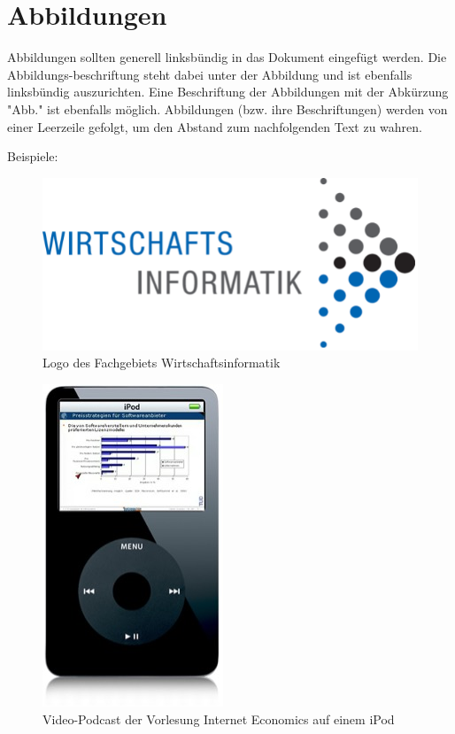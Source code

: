 \documentclass[
	ngerman,
	ruledheaders=section,%
	class=report,%
	thesis={type=bachelor},%
	accentcolor=1b,%
	custommargins=true,%
	marginpar=false,%
	parskip=half-,%
	fontsize=11pt,%
	DIV=14,
]{tudapub}
\begin{document}
 \section{Abbildungen}
Abbildungen sollten generell linksbündig in das Dokument eingefügt werden. Die Abbildungs-beschriftung steht dabei unter der Abbildung und ist ebenfalls linksbündig auszurichten. Eine Beschriftung der Abbildungen mit der Abkürzung "Abb." ist ebenfalls möglich. Abbildungen (bzw. ihre Beschriftungen) werden von einer Leerzeile gefolgt, um den Abstand zum nachfolgenden Text zu wahren.

Beispiele:

 
\begin{figure}[ht]
     \centering
     \includegraphics[]{images/Picture 1.png}
     \caption{Logo des Fachgebiets Wirtschaftsinformatik}
     \label{fig:logo}
\end{figure}

\begin{figure}[ht]
     \centering
     \includegraphics[]{images/Picture 1.jpg}
     \caption{Video-Podcast der Vorlesung Internet Economics auf einem iPod}
     \label{fig:logo2}
\end{figure}
\end{document}
